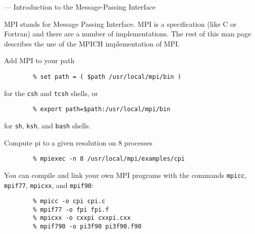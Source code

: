 \startmanpage
{}
--- Introduction to the Message-Passing Interface 
\par
MPI stands for Message Passing Interface.
MPI is a specification (like C or Fortran) and there are a number of
implementations.  The rest of this man page describes the use of the MPICH
implementation of MPI.
\par
{}
\par
Add MPI to your path
\begin{verbatim}
        % set path = ( $path /usr/local/mpi/bin )
\end{verbatim}

for the {\tt csh} and {\tt tcsh} shells, or
\begin{verbatim}
        % export path=$path:/usr/local/mpi/bin
\end{verbatim}

for {\tt sh}, {\tt ksh}, and {\tt bash} shells.
\par
Compute pi to a given resolution on 8 processes
\begin{verbatim}
        % mpiexec -n 8 /usr/local/mpi/examples/cpi
\end{verbatim}

\par
You can compile and link your own MPI programs with the commands {\tt mpicc},
{\tt mpif77}, {\tt mpicxx}, and {\tt mpif90}:
\begin{verbatim}
        % mpicc -o cpi cpi.c
        % mpif77 -o fpi fpi.f
        % mpicxx -o cxxpi cxxpi.cxx
        % mpif790 -o pi3f90 pi3f90.f90
\end{verbatim}

